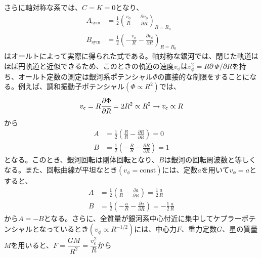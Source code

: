 さらに軸対称な系では、$C=K=0$となり、
\begin{subequations}
\begin{align}
	A_{\mathrm{sym}} &=\frac{1}{2}\left( \frac{v_{\phi}}{R} - \frac{\partial v_{\phi}}{\partial R} \right)_{R=R_0} \\
	B_{\mathrm{sym}} &=\frac{1}{2}\left( -\frac{v_{\phi}}{R} - \frac{\partial v_{\phi}}{\partial R} \right)_{R=R_0}
\end{align} \label{ABsym}
\end{subequations}
はオールトによって実際に得られた式である。軸対称な銀河では、閉じた軌道はほぼ円軌道と近似できるため、このときの軌道の速度$v_{\phi}$は$v_{\phi}^2=R \partial\ \Phi/\partial R$を持ち、オールト定数の測定は銀河系ポテンシャル$\Phi$の直接的な制限をすることになる。例えば、調和振動子ポテンシャル$(\Phi \propto R^2)$では、
\begin{align}
\begin{aligned}
    v_{\mathrm{c}} = R \cfrac{\partial \Phi}{\partial R} = 2R^2 \propto R^2 \to v_{\mathrm{c}} \propto R
\end{aligned}
\end{align}
から
\begin{subequations}
\begin{align}
	A &=\frac{1}{2}\left( \frac{R}{R} - \frac{\partial R}{\partial R} \right) = 0\\
	B &=\frac{1}{2}\left( -\frac{R}{R} - \frac{\partial R}{\partial R} \right) = 1
\end{align}
\end{subequations}
となる。このとき、銀河回転は剛体回転となり、$B$は銀河の回転周波数と等しくなる。また、回転曲線が平坦なとき$(v_{\phi}=\mathrm{const})$には、定数$a$を用いて$v_{\phi} = a$とすると、
\begin{subequations}
\begin{align}
	A &=\frac{1}{2}\left( \frac{a}{R} - \frac{\partial a}{\partial R} \right) = \frac{1}{2}\frac{a}{R}\\
	B &=\frac{1}{2}\left( -\frac{a}{R} - \frac{\partial a}{\partial R} \right) = -\frac{1}{2}\frac{a}{R}
\end{align}
\end{subequations}
から$A=-B$となる。さらに、全質量が銀河系中心付近に集中してケプラーポテンシャルとなっているとき$(v_{\phi} \propto R^{-1/2})$には、中心力$F$、重力定数$G$、星の質量$M$を用いると、$F = \dfrac{GM}{R^2} = \dfrac{v_{\mathrm{c}}^2}{R}$から

